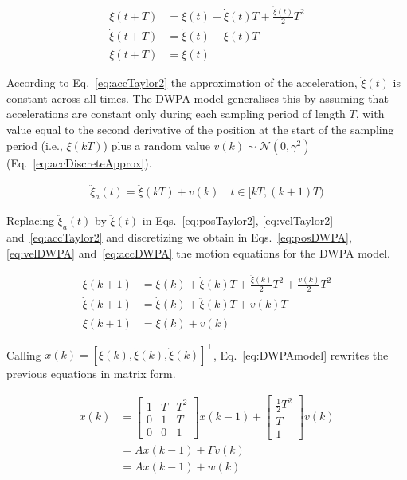 \documentclass[fleqn]{article}
\begin{document}
\begin{align}
    \xi(t+T)&=\xi(t)+\dot{\xi}(t)T+\frac{\ddot{\xi}(t)}{2}T^2\label{eq:posTaylor2}\\
    \dot{\xi}(t+T)&=\dot{\xi}(t)+\ddot{\xi}(t)T\label{eq:velTaylor2}\\
    \ddot{\xi}(t+T)&=\ddot{\xi}(t)\label{eq:accTaylor2}
\end{align}

According to Eq.~\ref{eq:accTaylor2} the approximation of the acceleration,
$\ddot{\xi}(t)$ is constant across all times. The DWPA model generalises this
by assuming that accelerations are constant only during each sampling period
of length $T$, with value equal to the second derivative of the position at the
start of the sampling period (i.e., $\ddot{\xi}(kT)$) plus a random value
$v(k)\sim\mathcal{N}(0,\gamma^2)$ (Eq.~\ref{eq:accDiscreteApprox}).

\begin{align}
    \ddot{\xi}_a(t)=\ddot{\xi}(kT)+v(k)\quad t\in[kT,(k+1)T)\label{eq:accDiscreteApprox}
\end{align}

Replacing $\ddot{\xi}_a(t)$ by $\ddot{\xi}(t)$ in Eqs.~\ref{eq:posTaylor2},
\ref{eq:velTaylor2} and~\ref{eq:accTaylor2} and discretizing we obtain in
Eqs.~\ref{eq:posDWPA}, \ref{eq:velDWPA} and~\ref{eq:accDWPA} the motion
equations for the DWPA model.

\begin{align}
    \xi(k+1)&=\xi(k)+\dot{\xi}(k)T+\frac{\ddot{\xi}(k)}{2}T^2+\frac{v(k)}{2}T^2\label{eq:posDWPA}\\
    \dot{\xi}(k+1)&=\dot{\xi}(k)+\ddot{\xi}(k)T+v(k)T\label{eq:velDWPA}\\
    \ddot{\xi}(k+1)&=\ddot{\xi}(k)+v(k)\label{eq:accDWPA}
\end{align}

Calling $x(k)=[\xi(k), \dot{\xi}(k), \ddot{\xi}(k)]^\intercal$,
Eq.~\ref{eq:DWPAmodel} rewrites the previous
equations in matrix form.

\begin{align}
    x(k)&=\begin{bmatrix}
        1 & T & T^2\\
        0 & 1 & T\\
        0 & 0 & 1
           \end{bmatrix}
           x(k-1)+
           \begin{bmatrix}
               \frac{1}{2}T^2\\
               T\\
               1
           \end{bmatrix}
           v(k)\nonumber\\
           &=Ax(k-1)+\Gamma v(k)\nonumber\\
           &=Ax(k-1)+w(k)\label{eq:DWPAmodel}
\end{align}
\end{document}
